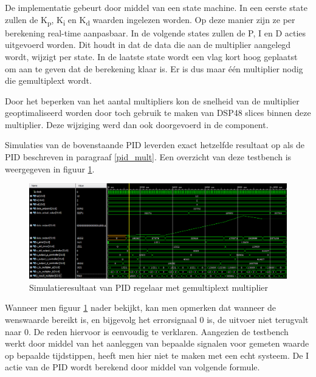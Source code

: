 			\par De implementatie gebeurt door middel van een state machine. In een eerste state zullen de  K\textsubscript{p}, K\textsubscript{i} en K\textsubscript{d} waarden ingelezen worden. Op deze manier zijn ze per berekening real-time aanpasbaar. In de volgende states zullen de P, I en D acties uitgevoerd worden. Dit houdt in dat de data die aan de multiplier aangelegd wordt, wijzigt per state. In de laatste state wordt een vlag kort hoog geplaatst om aan te geven dat de berekening klaar is. Er is dus maar \'e\'en multiplier nodig die gemultiplext wordt.

			\par Door het beperken van het aantal multipliers kon de snelheid van de multiplier geoptimaliseerd worden door toch gebruik te maken van DSP48 slices binnen deze multiplier. Deze wijziging werd dan ook doorgevoerd in de component.
\newpage
			\par Simulaties van de bovenstaande PID leverden exact hetzelfde resultaat op als de PID beschreven in paragraaf \ref{pid_mult}. Een overzicht van deze testbench is weergegeven in figuur \ref{pid_tb_mult}.

				\begin{figure}[H]					  
					  \centering
					  \includegraphics[width=\textwidth]{Implementatie/pid testbench.png}
					  \caption{Simulatieresultaat van PID regelaar met gemultiplext multiplier}
					  \label{pid_tb_mult}
				\end{figure}

			\par Wanneer men figuur \ref{pid_tb_mult} nader bekijkt, kan men opmerken dat wanneer de wenswaarde bereikt is, en bijgevolg het errorsignaal 0 is, de uitvoer niet terugvalt naar 0. De reden hiervoor is eenvoudig te verklaren. Aangezien de testbench werkt door middel van het aanleggen van bepaalde signalen voor gemeten waarde op bepaalde tijdstippen, heeft men hier niet te maken met een echt systeem. De I actie van de PID wordt berekend door middel van volgende formule.

